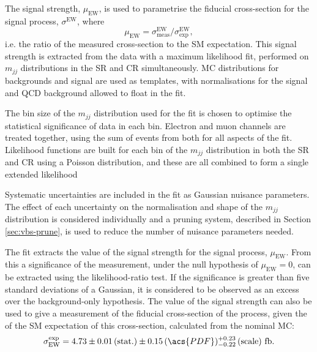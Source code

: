 
The signal strength, $\mu_\text{EW}$, is used to parametrise the fiducial
cross-section for the signal process, $\sigma^\text{EW}$, where
%
\begin{equation*}
  \mu_\text{EW} = \sigma^\text{EW}_\text{meas} / \sigma^\text{EW}_\text{exp},
\end{equation*}
%
i.e. the ratio of the measured cross-section to the \ac{SM} expectation. This
signal strength is extracted from the data with a maximum likelihood fit,
performed on $m_{jj}$ distributions in the \ac{SR} and \ac{CR} simultaneously.
\ac{MC} distributions for backgrounds and signal are used as templates, with
normalisations for the signal and \ac{QCD} \Zy background allowed to float in
the fit.

The bin size of the $m_{jj}$ distribution used for the fit is chosen to optimise
the statistical significance of data in each bin. Electron and muon channels are
treated together, using the sum of events from both for all aspects of the fit.
Likelihood functions are built for each bin of the $m_{jj}$ distribution in both
the \ac{SR} and \ac{CR} using a Poisson distribution, and these are all combined
to form a single extended likelihood

Systematic uncertainties are included in the fit as Gaussian nuisance
parameters. The effect of each uncertainty on the normalisation and shape of the
$m_{jj}$ distribution is considered individually and a pruning system, described
in Section \ref{sec:vbs-prune}, is used to reduce the number of nuisance
parameters needed.

The fit extracts the value of the signal strength for the signal process,
$\mu_\text{EW}$. From this a significance of the measurement, under the null
hypothesis of $\mu_\text{EW}=0$, can be extracted using the likelihood-ratio
test. If the significance is greater than five standard deviations of a
Gaussian, it is considered to be observed as an excess over the background-only
hypothesis. The value of the signal strength can also be used to give a
measurement of the fiducial cross-section of the process, given the of the
\ac{SM} expectation of this cross-section, calculated from the nominal \ac{MC}:
%
\begin{equation*}
  \sigma_\text{EW}^\text{exp} = 4.73
  \pm 0.01 \, (\text{stat.})
  \pm 0.15 \, (\acs{PDF})
  ^{+0.23} _{-0.22} \, (\text{scale})
  ~\text{fb}.
\end{equation*}
